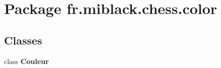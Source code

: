 \section{Package fr.\-miblack.\-chess.\-color}
\label{namespacefr_1_1miblack_1_1chess_1_1color}
\subsection*{Classes}
\begin{DoxyCompactItemize}
\item 
class {\bf Couleur}
\end{DoxyCompactItemize}
